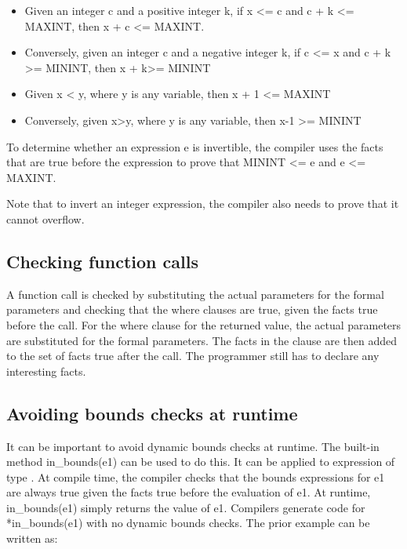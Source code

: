 \begin{itemize}
\item
  Given an integer c and a positive integer k, if x \textless{}= c and c
  + k \textless{}= MAXINT, then x + c \textless{}= MAXINT.
\item
  Conversely, given an integer c and a negative integer k, if c
  \textless{}= x and c + k \textgreater{}= MININT, then x +
  k\textgreater{}= MININT
\item
  Given x \textless{} y, where y is any variable, then x + 1
  \textless{}= MAXINT
\item
  Conversely, given x\textgreater{}y, where y is any variable, then x-1
  \textgreater{}= MININT
\end{itemize}

To determine whether an expression e is invertible, the compiler uses
the facts that are true before the expression to prove that MININT
\textless{}= e and e \textless{}= MAXINT.

Note that to invert an integer expression, the compiler also needs to
prove that it cannot overflow.

\subsection{Checking function calls}\label{checking-function-calls}

A function call is checked by substituting the actual parameters for the
formal parameters and checking that the where clauses are true, given
the facts true before the call. For the where clause for the returned
value, the actual parameters are substituted for the formal parameters.
The facts in the clause are then added to the set of facts true after
the call. The programmer still has to declare any interesting facts.

\subsection{Avoiding bounds checks at runtime}
\label{section:avoiding-bounds-checks}

It can be important to avoid dynamic bounds checks at runtime. The
built-in method in\_bounds(e1) can be used to do this. It can be applied
to expression of type \arrayptr. At compile time, the compiler
checks that the bounds expressions for e1 are always true given the
facts true before the evaluation of e1. At runtime, in\_bounds(e1)
simply returns the value of e1. Compilers generate code for
*in\_bounds(e1) with no dynamic bounds checks. The prior example can be
written as:

